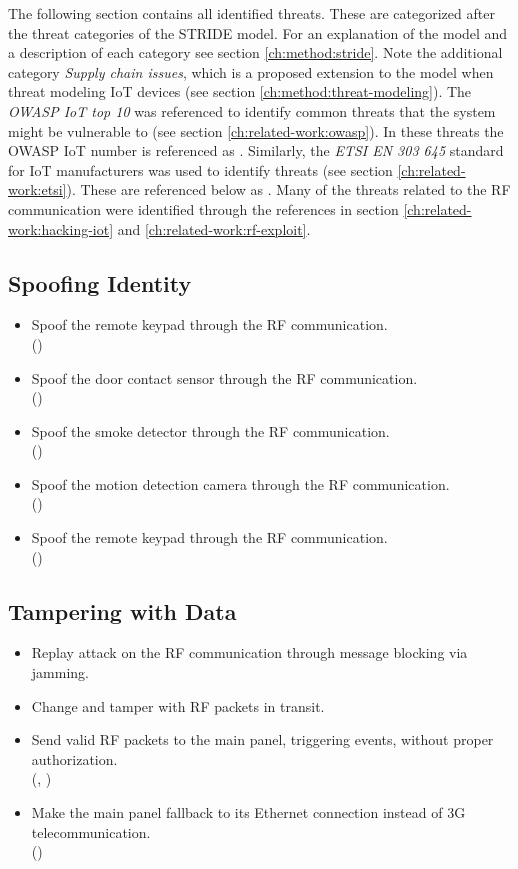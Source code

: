 The following section contains all identified threats. These are categorized after the threat categories of the STRIDE model. For an explanation of the model and a description of each category see section \ref{ch:method:stride}. Note the additional category \textit{Supply chain issues}, which is a proposed extension to the model when threat modeling IoT devices \cite{guzman2017iot} (see section \ref{ch:method:threat-modeling}). The \textit{OWASP IoT top 10} \cite{owasp-iot-top10} was referenced to identify common threats that the system might be vulnerable to (see section \ref{ch:related-work:owasp}). In these threats the OWASP IoT number is referenced as \textit{}. Similarly, the \textit{ETSI EN 303 645} standard \cite{etsi-iot-standard} for IoT manufacturers was used to identify threats (see section \ref{ch:related-work:etsi}). These are referenced below as \textit{}. Many of the threats related to the RF communication were identified through the references in section \ref{ch:related-work:hacking-iot} and \ref{ch:related-work:rf-exploit}.

\subsection{Spoofing Identity}
\begin{itemize}
    \item Spoof the remote keypad through the RF communication.
    \\ ()
    \item Spoof the door contact sensor through the RF communication.
    \\ ()
    \item Spoof the smoke detector through the RF communication.
    \\ ()
    \item Spoof the motion detection camera through the RF communication.
    \\ ()
    \item Spoof the remote keypad through the RF communication.
    \\ ()
\end{itemize}

\subsection{Tampering with Data}
\begin{itemize}
    \item Replay attack on the RF communication through message blocking via jamming.
    \item Change and tamper with RF packets in transit.
    \item Send valid RF packets to the main panel, triggering events, without proper authorization.
    \\ (, )
    \item Make the main panel fallback to its Ethernet connection instead of 3G telecommunication.
    \\ ()
\end{itemize}

